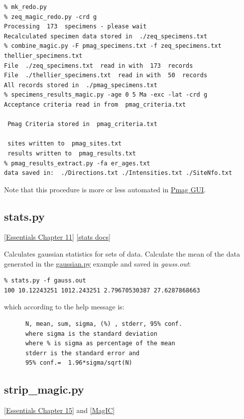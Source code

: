 \documentclass[11pt]{book}
\begin{document}
{\begin{verbatim}
% mk_redo.py
% zeq_magic_redo.py -crd g
Processing  173  specimens - please wait
Recalculated specimen data stored in  ./zeq_specimens.txt
% combine_magic.py -F pmag_specimens.txt -f zeq_specimens.txt thellier_specimens.txt
File  ./zeq_specimens.txt  read in with  173  records
File  ./thellier_specimens.txt  read in with  50  records
All records stored in  ./pmag_specimens.txt
% specimens_results_magic.py -age 0 5 Ma -exc -lat -crd g
Acceptance criteria read in from  pmag_criteria.txt

 Pmag Criteria stored in  pmag_criteria.txt

 sites written to  pmag_sites.txt
 results written to  pmag_results.txt
% pmag_results_extract.py -fa er_ages.txt
data saved in:  ./Directions.txt ./Intensities.txt ./SiteNfo.txt
\end{verbatim}

Note that this procedure is more or less automated in \href{#pmag_gui.py}{Pmag GUI}.



\subsection{stats.py}
\href{http://earthref.org/MAGIC/books/Tauxe/Essentials/WebBook3ch11.html#ch11}{[Essentials Chapter 11]}
\href{https://github.com/PmagPy/PmagPy/blob/master/programs/stats.py}{[stats docs]}

Calculates gaussian statistics for sets of data.
Calculate the mean of the data generated in the \href{#gaussian.py}{gaussian.py} example and saved in {\it gauss.out}:

\begin{verbatim}
% stats.py -f gauss.out
100 10.12243251 1012.243251 2.79670530387 27.6287868663
\end{verbatim}

which according to the help message is:

\begin{verbatim}
      N, mean, sum, sigma, (%) , stderr, 95% conf.
      where sigma is the standard deviation
      where % is sigma as percentage of the mean
      stderr is the standard error and
      95% conf.=  1.96*sigma/sqrt(N)
\end{verbatim}


\subsection{strip\_magic.py}
\href{http://earthref.org/MAGIC/books/Tauxe/Essentials/WebBook3ch15.html#ch15}{[Essentials Chapter 15]} and \href{#MagIC}{[MagIC}]

}
\end{document}
